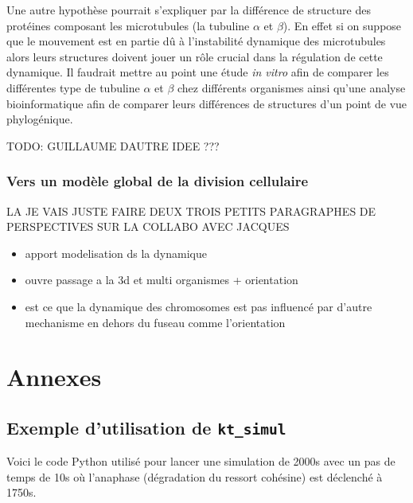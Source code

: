\documentclass[12pt,a4paper,twoside,openright]{book}
\providecommand{\tightlist}{%
  \setlength{\itemsep}{0pt}\setlength{\parskip}{0pt}}
\begin{document}
Une autre hypothèse pourrait s'expliquer par la différence de structure
des protéines composant les microtubules (la tubuline \(\alpha\) et
\(\beta\)). En effet si on suppose que le mouvement est en partie dû à
l'instabilité dynamique des microtubules alors leurs structures doivent
jouer un rôle crucial dans la régulation de cette dynamique. Il faudrait
mettre au point une étude \emph{in vitro} afin de comparer les
différentes type de tubuline \(\alpha\) et \(\beta\) chez différents
organismes ainsi qu'une analyse bioinformatique afin de comparer leurs
différences de structures d'un point de vue phylogénique.

TODO: GUILLAUME DAUTRE IDEE ???

\subsection{Vers un modèle global de la division
cellulaire}\label{vers-un-moduxe8le-global-de-la-division-cellulaire}

LA JE VAIS JUSTE FAIRE DEUX TROIS PETITS PARAGRAPHES DE PERSPECTIVES SUR
LA COLLABO AVEC JACQUES

\begin{itemize}
\tightlist
\item
  apport modelisation ds la dynamique
\item
  ouvre passage a la 3d et multi organismes + orientation
\item
  est ce que la dynamique des chromosomes est pas influencé par d'autre
  mechanisme en dehors du fuseau comme l'orientation
\end{itemize}

\appendix

\chapter{Annexes}\label{annexes}

\section{\texorpdfstring{Exemple d'utilisation de
\texttt{kt\_simul}}{Exemple d'utilisation de kt\_simul}}\label{exemple-dutilisation-de-ktux5fsimul}

\label{sec:ktsimul}

Voici le code Python utilisé pour lancer une simulation de 2000s avec un
pas de temps de 10s où l'anaphase (dégradation du ressort cohésine) est
déclenché à 1750s.
\end{document}
